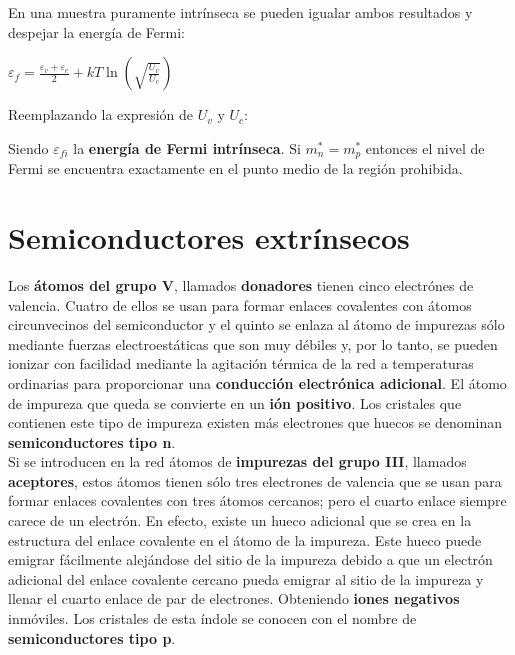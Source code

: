 \documentclass[oneside]{book}
\numberwithin{equation}{section}
\numberwithin{figure}{section}
\numberwithin{table}{section}
\begin{document}
			En una muestra puramente intrínseca se pueden igualar ambos resultados y despejar la energía de Fermi:\\
			
			\begin{center}
				$\displaystyle \varepsilon_f=\frac{\varepsilon_v+\varepsilon_c}{2}+kT \ln\left(\sqrt{\frac{U_v}{U_c}}\right)$
			\end{center}
						
			Reemplazando la expresión de  $U_v$ y $U_c$:\\				
			
			\begin{center}
			\end{center}			
			
			Siendo $\varepsilon_{fi}$ la \textbf{energía de Fermi intrínseca}. Si $m_n^*=m_p^*$ entonces el nivel de Fermi se encuentra exactamente en el punto medio de la región prohibida.
			
		\section{Semiconductores extrínsecos}	

			Los \textbf{átomos del grupo V}, llamados \textbf{donadores} tienen cinco electrónes de valencia. Cuatro de ellos se usan para formar enlaces covalentes con átomos circunvecinos del semiconductor y el quinto se enlaza al átomo de impurezas sólo mediante fuerzas electroestáticas que son muy débiles y, por lo tanto, se pueden ionizar con facilidad mediante la agitación térmica de la red a temperaturas ordinarias para proporcionar una \textbf{conducción electrónica adicional}. El átomo de impureza que queda se convierte en un \textbf{ión positivo}. Los cristales que contienen este tipo de impureza existen más electrones que huecos se denominan \textbf{semiconductores tipo n}.\\

			Si se introducen en la red átomos de \textbf{impurezas del grupo III}, llamados \textbf{aceptores}, estos átomos tienen sólo tres electrones de valencia que se usan para formar enlaces covalentes con tres átomos cercanos; pero el cuarto enlace siempre carece de un electrón. En efecto, existe un hueco adicional que se crea en la estructura del enlace covalente en el átomo de la impureza. Este hueco puede emigrar fácilmente alejándose del sitio de la impureza debido a que un electrón adicional del enlace covalente cercano pueda emigrar al sitio de la impureza y llenar el cuarto enlace de par de electrones. Obteniendo \textbf{iones negativos} inmóviles. Los cristales de esta índole se conocen con el nombre de \textbf{semiconductores tipo p}.\\
\end{document}
